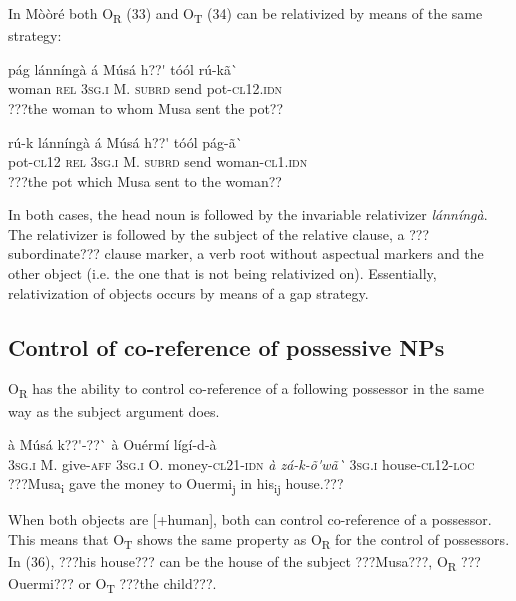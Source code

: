 \documentclass[output=paper]{langsci/langscibook}
\begin{document}

In Mòòré both O\textsubscript{R} (33) and O\textsubscript{T} (34) can be relativized by means of the same strategy:


\ea \gll 
\label{bkm:Ref424233046}pág    lánníngà  á    Músá  h??\'{ }    tóól  rú-kã\`{ }
\\
%
woman  \textsc{rel}    \textsc{3sg.i  }  M.  \textsc{subrd}    send  pot-\textsc{cl12.idn}
\\\glt
???the woman to whom Musa sent the pot??
\z


\ea \gll 
\label{bkm:Ref424233055}rú-k    lánníngà  á    Músá  h??\'{ }    tóól  pág-ã\`{ }
\\
%
pot-\textsc{cl12}  \textsc{rel}    \textsc{3sg.i  }  M.  \textsc{subrd}    send  woman-\textsc{cl1.idn}
\\\glt
???the pot which Musa sent to the woman??
\z

In both cases, the head noun is followed by the invariable relativizer \textit{lánníngà}. The relativizer is followed by the subject of the relative clause, a ???subordinate??? clause marker, a verb root without aspectual markers and the other object (i.e. the one that is not being relativized on). Essentially, relativization of objects occurs by means of a gap strategy. 

\subsection{Control of co{}-reference of possessive NPs}

O\textsubscript{R} has the ability to control co-reference of a following possessor{ }in the same way as the subject argument does.


\ea \gll 
à    Músá  k??\'{ }-??\`{ }  à    Ouérmí  lígí-d-à    
\\
%
\textsc{3sg.i}  M.  give-\textsc{aff  3sg.i}    O.            money-\textsc{cl21-idn}     \textit{à    zá-k-\~{o}\'{ }wã\`{ }}  
%
  \textsc{3sg.i  }  house-\textsc{cl12-loc}
\\\glt
???Musa\textsubscript{i} gave the money to Ouermi\textsubscript{j} in his\textsubscript{ij} house.???
\z

When both objects are [+human], both can control co-reference of a possessor. This means that O\textsubscript{T }shows the same property as O\textsubscript{R} for the control of possessors. In (36), ???his house??? can be the house of the subject ???Musa???, O\textsubscript{R} ???Ouermi??? or O\textsubscript{T} ???the child???.
\end{document}
